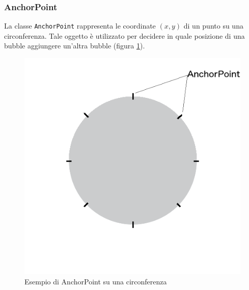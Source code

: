 \subsubsection{AnchorPoint}

La classe \texttt{AnchorPoint} rappresenta le coordinate $(x,y)$ di un punto su una circonferenza. Tale oggetto è utilizzato per decidere in quale posizione di una bubble aggiungere un'altra bubble (figura \ref{fig:anchor}). 

\begin{figure}[!htbp]
\centering
\includegraphics[scale=0.4]{dettagli/anchor.png}
\caption{Esempio di AnchorPoint su una circonferenza}
\label{fig:anchor}
\end{figure}

